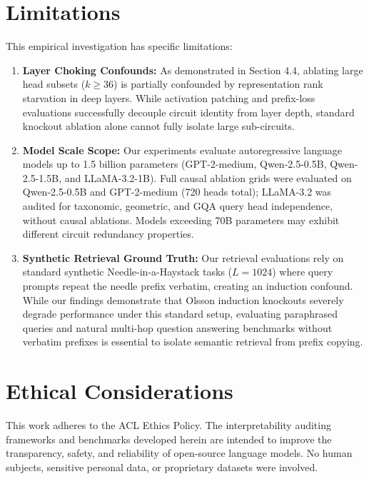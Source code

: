 \documentclass[11pt]{article}
\begin{document}
\clearpage
\section*{Limitations}
This empirical investigation has specific limitations:
\begin{enumerate}
    \setlength{\itemsep}{1pt}
    \item \textbf{Layer Choking Confounds:} As demonstrated in Section 4.4, ablating large head subsets ($k \ge 36$) is partially confounded by representation rank starvation in deep layers. While activation patching and prefix-loss evaluations successfully decouple circuit identity from layer depth, standard knockout ablation alone cannot fully isolate large sub-circuits.
    \item \textbf{Model Scale Scope:} Our experiments evaluate autoregressive language models up to 1.5 billion parameters (GPT-2-medium, Qwen-2.5-0.5B, Qwen-2.5-1.5B, and LLaMA-3.2-1B). Full causal ablation grids were evaluated on Qwen-2.5-0.5B and GPT-2-medium (720 heads total); LLaMA-3.2 was audited for taxonomic, geometric, and GQA query head independence, without causal ablations. Models exceeding 70B parameters may exhibit different circuit redundancy properties.
    \item \textbf{Synthetic Retrieval Ground Truth:} Our retrieval evaluations rely on standard synthetic Needle-in-a-Haystack tasks ($L=1024$) where query prompts repeat the needle prefix verbatim, creating an induction confound. While our findings demonstrate that Olsson induction knockouts severely degrade performance under this standard setup, evaluating paraphrased queries and natural multi-hop question answering benchmarks without verbatim prefixes is essential to isolate semantic retrieval from prefix copying.
\end{enumerate}

\section*{Ethical Considerations}
This work adheres to the ACL Ethics Policy. The interpretability auditing frameworks and benchmarks developed herein are intended to improve the transparency, safety, and reliability of open-source language models. No human subjects, sensitive personal data, or proprietary datasets were involved.



\appendix
\end{document}
